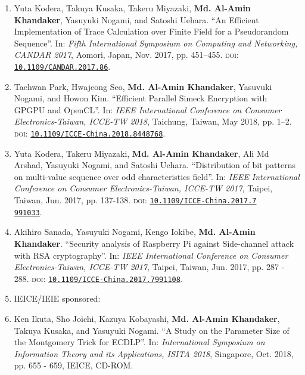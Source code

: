 \begin{enumerate}
	
	\item	Yuta Kodera, Takuya Kusaka, Takeru Miyazaki, \textbf{Md. Al-Amin Khandaker}, Yasuyuki Nogami, and Satoshi Uehara. ``An Efficient Implementation of Trace Calculation over Finite Field for a Pseudorandom Sequence''. In: \textit{Fifth International Symposium on Computing and Networking, CANDAR 2017}, Aomori, Japan, Nov. 2017, pp. 451–455. \textsc{doi}: \href{https://doi.org/10.1109/CANDAR.2017.86}{\texttt{10.1109/CANDAR.2017.86}}.
	
	\item Taehwan Park, Hwajeong Seo, \textbf{Md. Al-Amin Khandaker}, Yasuvuki Nogami, and Howon Kim. ``Efficient Parallel Simeck Encryption with GPGPU and OpenCL''. In: \textit{IEEE International Conference on Consumer Electronics-Taiwan, ICCE-TW 2018}, Taichung, Taiwan, May 2018, pp. 1–2. \textsc{doi}: \href{https://doi.org/10.1109/ICCE-China.2018.8448768}{\texttt{10.1109/ICCE-China.2018.8448768}}.
	
	\item Yuta Kodera, Takeru Miyazaki, \textbf{Md. Al-Amin Khandaker}, Ali Md Arshad, Yasuyuki Nogami, and Satoshi Uehara. ``Distribution of bit patterns on multi-value sequence over odd characteristics field''.  In: \textit{IEEE International Conference on Consumer Electronics-Taiwan, ICCE-TW 2017}, Taipei, Taiwan, Jun. 2017, pp. 137-138. \textsc{doi}: \href{https://doi.org/10.1109/ICCE-China.2017.7991033}{\texttt{10.1109/ICCE-China.2017.7\\991033}}.	
	
	\item Akihiro Sanada, Yasuyuki Nogami, Kengo Iokibe, \textbf{Md. Al-Amin Khandaker}. ``Security analysis of Raspberry Pi against Side-channel attack with RSA cryptography''. In: \textit{IEEE International Conference on Consumer Electronics-Taiwan, ICCE-TW 2017}, Taipei, Taiwan, Jun. 2017, pp. 287 - 288. \textsc{doi}: \href{https://doi.org/10.1109/ICCE-China.2017.7991108}{\texttt{10.1109/ICCE-China.2017.7991108}}.	
	
	\vspace{10mm}
	\item[ ] \Large IEICE/IEIE sponsored:
	\normalsize
	\item Ken Ikuta, Sho Joichi, Kazuya Kobayashi, \textbf{Md. Al-Amin Khandaker}, Takuya Kusaka, and Yasuyuki Nogami. ``A Study on the Parameter Size of the Montgomery Trick for ECDLP''. In: \textit{International Symposium on Information Theory and its Applications, ISITA 2018}, Singapore, Oct. 2018,  pp. 655 - 659,  IEICE, CD-ROM.
	

\end{enumerate}
